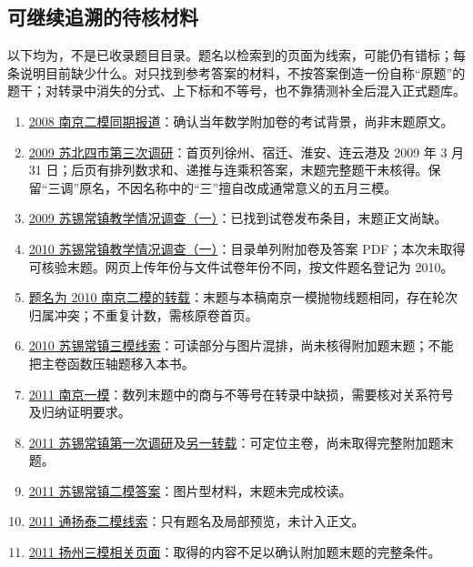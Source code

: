 \documentclass[UTF8]{ctexart}
\begin{document}
\subsection{可继续追溯的待核材料}
以下均为，不是已收录题目目录。题名以检索到的页面为线索，可能仍有错标；每条说明目前缺少什么。对只找到参考答案的材料，不按答案倒造一份自称“原题”的题干；对转录中消失的分式、上下标和不等号，也不靠猜测补全后混入正式题库。
\begin{enumerate}
\item \href{https://edu.sina.com.cn/gaokao/2008-04-28/1038136658.shtml}{2008 南京二模同期报道}：确认当年数学附加卷的考试背景，尚非末题原文。
\item \href{https://doc.xuehai.net/b8dc14801260df2bee36b2ffd.html}{2009 苏北四市第三次调研}：首页列徐州、宿迁、淮安、连云港及 2009 年 3 月 31 日；后页有排列数求和、递推与连乘积答案，末题完整题干未核得。保留“三调”原名，不因名称中的“三”擅自改成通常意义的五月三模。
\item \href{https://m.liuxue86.com/a/485326.html}{2009 苏锡常镇教学情况调查（一）}：已找到试卷发布条目，末题正文尚缺。
\item \href{https://www.tthaoke.com/shijuan_37108.html}{2010 苏锡常镇教学情况调查（一）}：目录单列附加卷及答案 PDF；本次未取得可核验末题。网页上传年份与文件试卷年份不同，按文件题名登记为 2010。
\item \href{https://doc.xuehai.net/ba99b4701970c23149844d317.html}{题名为 2010 南京二模的转载}：末题与本稿南京一模抛物线题相同，存在轮次归属冲突；不重复计数，需核原卷首页。
\item \href{https://doc.xuehai.net/bdb0bd5ffdb8e57341a9c50cf.html}{2010 苏锡常镇三模线索}：可读部分与图片混排，尚未核得附加题末题；不能把主卷函数压轴题移入本书。
\item \href{https://doc.xuehai.net/bd5dae6b568cf4072bb664ad4.html}{2011 南京一模}：数列末题中的商与不等号在转录中缺损，需要核对关系符号及归纳证明要求。
\item \href{https://wenku.baidu.com/view/47100f08581b6bd97f19eaf9.html}{2011 苏锡常镇第一次调研}及\href{https://max.book118.com/html/2016/1021/60264575.shtm}{另一转载}：可定位主卷，尚未取得完整附加题末题。
\item \href{https://doc.xuehai.net/b5e02fd9333058500970cd509.html}{2011 苏锡常镇二模答案}：图片型材料，末题未完成校读。
\item \href{https://max.book118.com/html/2017/0331/98187113.shtm}{2011 通扬泰二模线索}：只有题名及局部预览，未计入正文。
\item \href{https://www.renrendoc.com/paper/112511852.html}{2011 扬州三模相关页面}：取得的内容不足以确认附加题末题的完整条件。

\end{enumerate}
\end{document}
